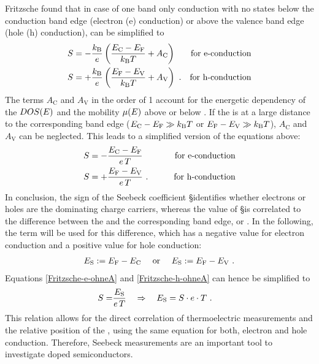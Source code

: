 Fritzsche found that in case of one band only conduction with no states below the conduction band edge \Ec (electron (e) conduction) or above the valence band edge \Ev (hole (h) conduction),  can be simplified to
\begin{align}
\S &= -\frac{\kB}{e} \left( \frac{\Ec-\Ef}{\kT} + A_\text{C}\right) & \text{for e-conduction} \label{eq:Fritzsche-e} \\
\S &= +\frac{\kB}{e} \left( \frac{\Ef-\Ev}{\kT} + A_\text{V}\right) \PUNKT & \text{for h-conduction} \label{eq:Fritzsche-h}
\end{align}
The terms $A_\text{C}$ and $A_\text{V}$ in the order of 1 account for the energetic dependency of the \dosLong $DOS(E)$ and the mobility $\mob(E)$ above \Ec or below \Ev.
If the \EfLong is at a large distance to the corresponding band edge
(\mbox{$E_\text{C}-E_\text{F}\gg k_\text{B}T$} or \mbox{$E_\text{F}-E_\text{V}\gg k_\text{B}T$}), $A_\text{C}$ and $A_\text{V}$ can be neglected. This leads to a simplified version of the equations above:
\begin{align}
\S &= - \frac{\Ec-\Ef}{e\,\T} & \quad\quad\text{for e-conduction} \label{eq:Fritzsche-e-ohneA} \\
\S &= + \frac{\Ef-\Ev}{e\,\T} \PUNKT & \quad\quad\text{for h-conduction} \label{eq:Fritzsche-h-ohneA}
\end{align}
%
%
In conclusion, the sign of the Seebeck coefficient \S identifies whether electrons or holes are the dominating charge carriers, whereas the value of \S is correlated to the difference between the \EfLong and the corresponding band edge, \Ec or \Ev. In the following, the term \EsLong \Es will be used for this difference, which has a negative value for electron conduction and a positive value for hole conduction:
\begin{align}
\Es := \Ef-\Ec \quad\text{ or }\quad \Es := \Ef-\Ev
\label{eq:DefEs-Ec-Ev-inorg}
\PUNKT
\end{align}
Equations \eqref{Fritzsche-e-ohneA} and \eqref{Fritzsche-h-ohneA} can hence be simplified to
\begin{align}
\S =& \frac{\Es}{e\,\T} \quad \Rightarrow \quad \Es = \S \cdot e \cdot \T \label{eq:S-Es-inorg}
\PUNKT
\end{align}
This relation allows for the direct correlation of thermoelectric measurements and the relative position of the \EfLong, using the same equation for both, electron and hole conduction. Therefore, Seebeck measurements are an important tool to investigate doped semiconductors.

